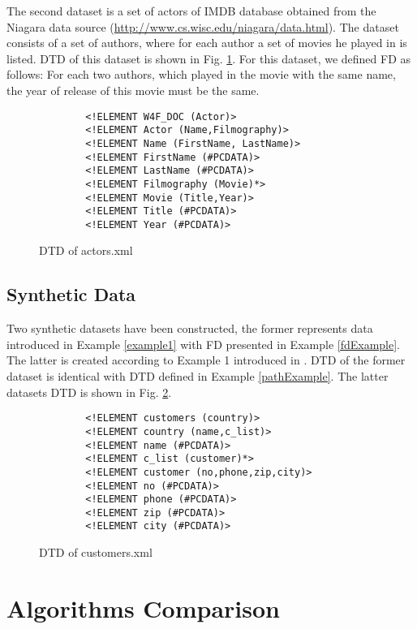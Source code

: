 The second dataset is a set of actors of IMDB database obtained from the Niagara data source (\url{http://www.cs.wisc.edu/niagara/data.html}). The dataset consists of a set of authors, where for each author a set of movies he played in is listed. DTD of this dataset is shown in Fig. \ref{actorsDTD}. For this dataset, we defined FD as follows: For each two authors, which played in the movie with the same name, the year of release of this movie must be the same.

\begin{figure}[H]
    \begin{verbatim}
        <!ELEMENT W4F_DOC (Actor)>
        <!ELEMENT Actor (Name,Filmography)>
        <!ELEMENT Name (FirstName, LastName)>
        <!ELEMENT FirstName (#PCDATA)>
        <!ELEMENT LastName (#PCDATA)>
        <!ELEMENT Filmography (Movie)*>
        <!ELEMENT Movie (Title,Year)>
        <!ELEMENT Title (#PCDATA)>
        <!ELEMENT Year (#PCDATA)>
    \end{verbatim}
    \caption{DTD of actors.xml}
    \label{actorsDTD}
\end{figure}

\subsection{Synthetic Data}

Two synthetic datasets have been constructed, the former represents data introduced in Example \ref{example1} with FD presented in Example \ref{fdExample}. The latter is created according to Example 1 introduced in \cite{ImprovingXML}. DTD of the former dataset is identical with DTD defined in Example \ref{pathExample}. The latter datasets DTD is shown in Fig. \ref{synthDTD}.

\begin{figure}[H]
    \begin{verbatim}
        <!ELEMENT customers (country)>
        <!ELEMENT country (name,c_list)>
        <!ELEMENT name (#PCDATA)>
        <!ELEMENT c_list (customer)*>
        <!ELEMENT customer (no,phone,zip,city)>
        <!ELEMENT no (#PCDATA)>
        <!ELEMENT phone (#PCDATA)>
        <!ELEMENT zip (#PCDATA)>
        <!ELEMENT city (#PCDATA)>
    \end{verbatim}
    \caption{DTD of customers.xml}
    \label{synthDTD}
\end{figure}

\section{Algorithms Comparison}

